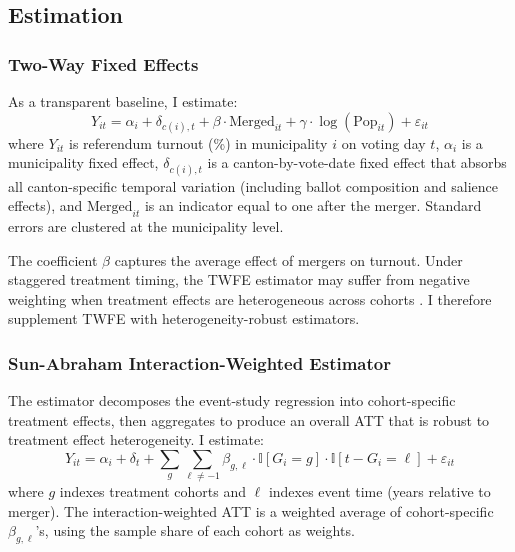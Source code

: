 \documentclass[12pt]{article}
\newcommand{\ind}{\mathbb{I}}
\begin{document}
\subsection{Estimation}

\subsubsection{Two-Way Fixed Effects}

As a transparent baseline, I estimate:
\begin{equation}
    Y_{it} = \alpha_i + \delta_{c(i),t} + \beta \cdot \text{Merged}_{it} + \gamma \cdot \log(\text{Pop}_{it}) + \varepsilon_{it}
    \label{eq:twfe}
\end{equation}
where $Y_{it}$ is referendum turnout (\%) in municipality $i$ on voting day $t$, $\alpha_i$ is a municipality fixed effect, $\delta_{c(i),t}$ is a canton-by-vote-date fixed effect that absorbs all canton-specific temporal variation (including ballot composition and salience effects), and $\text{Merged}_{it}$ is an indicator equal to one after the merger. Standard errors are clustered at the municipality level.

The coefficient $\beta$ captures the average effect of mergers on turnout. Under staggered treatment timing, the TWFE estimator may suffer from negative weighting when treatment effects are heterogeneous across cohorts \citep{goodmanbacon2021difference, borusyak2024revisiting}. I therefore supplement TWFE with heterogeneity-robust estimators.

\subsubsection{Sun-Abraham Interaction-Weighted Estimator}

The \citet{sunandabraham2021} estimator decomposes the event-study regression into cohort-specific treatment effects, then aggregates to produce an overall ATT that is robust to treatment effect heterogeneity. I estimate:
\begin{equation}
    Y_{it} = \alpha_i + \delta_t + \sum_{g} \sum_{\ell \neq -1} \beta_{g,\ell} \cdot \ind[G_i = g] \cdot \ind[t - G_i = \ell] + \varepsilon_{it}
\end{equation}
where $g$ indexes treatment cohorts and $\ell$ indexes event time (years relative to merger). The interaction-weighted ATT is a weighted average of cohort-specific $\beta_{g,\ell}$'s, using the sample share of each cohort as weights.
\end{document}
